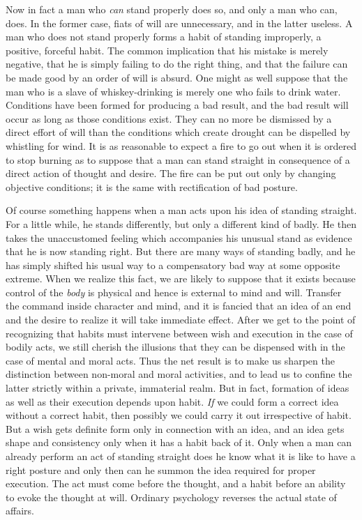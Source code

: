 \documentclass[12pt]{article}
\begin{document}
Now in fact a man who \emph{can} stand properly does so,
and only a man who can, does. In the former case,
fiats of will are unnecessary, and in the latter useless.
A man who does not stand properly forms a habit of
standing improperly, a positive, forceful habit. The
common implication that his mistake is merely negative,
that he is simply failing to do the right thing, and
that the failure can be made good by an order of will
is absurd. One might as well suppose that the man
who is a slave of whiskey-drinking is merely one who
fails to drink water. Conditions have been formed for
producing a bad result, and the bad result will occur
as long as those conditions exist. They can no more
be dismissed by a direct effort of will than the conditions
which create drought can be dispelled by whistling
for wind. It is as reasonable to expect a fire to go out
when it is ordered to stop burning as to suppose that
a man can stand straight in consequence of a direct
action of thought and desire. The fire can be put out
only by changing objective conditions; it is the same
with rectification of bad posture.

Of course something happens when a man acts upon
his idea of standing straight. For a little while, he
stands differently, but only a different kind of badly.
He then takes the unaccustomed feeling which accompanies
his unusual stand as evidence that he is now
standing right. But there are many ways of standing
badly, and he has simply shifted his usual way to a
compensatory bad way at some opposite extreme.
When we realize this fact, we are likely to suppose that
it exists because control of the \emph{body} is physical and
hence is external to mind and will. Transfer the command
inside character and mind, and it is fancied that
an idea of an end and the desire to realize it will take
immediate effect. After we get to the point of recognizing
that habits must intervene between wish and
execution in the case of bodily acts, we still cherish
the illusions that they can be dispensed with in the case
of mental and moral acts. Thus the net result is to
make us sharpen the distinction between non-moral and
moral activities, and to lead us to confine the latter
strictly within a private, immaterial realm. But in
fact, formation of ideas as well as their execution depends
upon habit. \emph{If} we could form a correct idea
without a correct habit, then possibly we could carry
it out irrespective of habit. But a wish gets definite
form only in connection with an idea, and an idea gets
shape and consistency only when it has a habit back of
it. Only when a man can already perform an act of
standing straight does he know what it is like to have
a right posture and only then can he summon the
idea required for proper execution. The act must come
before the thought, and a habit before an ability to
evoke the thought at will. Ordinary psychology reverses
the actual state of affairs.
\end{document}
